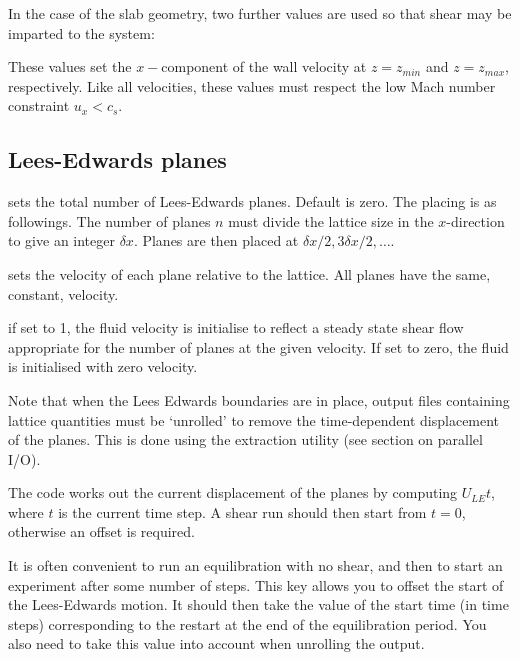 In the case of the slab geometry, two further values are used so
that shear may be imparted to the system:



These values set the $x-$component of the wall velocity at
$z = z_{min}$ and $z = z_{max}$, respectively. Like all
velocities, these values must respect the low Mach number
constraint $u_x < c_s$.

\subsection{Lees-Edwards planes}


sets the total number of Lees-Edwards planes. Default is zero.
The placing is as followings. The number of planes $n$ must
divide the lattice size in the $x$-direction to give an integer
$\delta x$. Planes are then placed at $\delta x / 2, 3\delta x/2, \ldots$.


sets the velocity of each plane relative to the lattice. All planes
have the same, constant, velocity.


if set to 1, the fluid velocity is initialise to reflect a steady
state shear flow appropriate for the number of planes at the
given velocity. If set to zero, the fluid is initialised with
zero velocity.

Note that when the Lees Edwards boundaries are in place, output
files containing lattice quantities must be `unrolled' to remove
the time-dependent displacement of the planes. This is done using
the extraction utility (see section on parallel I/O).

The code works out the
current displacement of the planes by computing $U_{LE} t$, where
$t$ is the current time step. A shear run should then start from
$t = 0$, otherwise an offset is required.


It is often convenient to run an equilibration with no shear, and
then to start an experiment after some number of steps. This
key allows you to offset the start of the Lees-Edwards motion.
It should then take the value of the start time (in time steps)
corresponding to the restart at the end of the equilibration
period. You also need to take this value into account when unrolling
the output.

